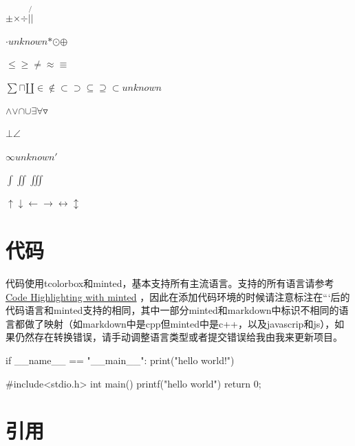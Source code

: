\documentclass{article}%
\begin{document}
%
$\pm{}$$\times{}$$\div{}$$|{}$$\not{|}{}$%

%
$\cdot{}$$unknown$$\ast{}$$\odot{}$$\oplus{}$%

%
$\leq{}$$\geq{}$$\neq{}$$\approx{}$$\equiv{}$%

%
$\sum{}$$\sqcap{}$$\amalg{}$$\in{}$$\notin{}$$\subset{}$$\supset{}$$\subseteq{}$$\supseteq{}$$\subset{}$$unknown$%

%
$\wedge{}$$\vee{}$$\cap{}$$\cup{}$$\exists{}$$\forall{}$$\triangledown{}$%

%
$\bot{}$$\angle{}$%

%
$\infty{}$$unknown$$'{}$%

%
$\int{}$$\iint{}$$\iiint{}$%

%
$\uparrow{}$$\downarrow{}$$\leftarrow{}$$\to{}$$\leftrightarrow{}$$\updownarrow{}$

%

%
%
%

%
\section{代码}%

%
代码使用tcolorbox和minted，基本支持所有主流语言。支持的所有语言请参考 \href{https://www.overleaf.com/learn/latex/Code_Highlighting_with_minted}{Code Highlighting with minted} ，因此在添加代码环境的时候请注意标注在```后的代码语言和minted支持的相同，其中一部分minted和markdown中标识不相同的语言都做了映射（如markdown中是cpp但minted中是c++，以及javascrip和js），如果仍然存在转换错误，请手动调整语言类型或者提交错误给我由我来更新项目。%

%

%
\begin{langbox}[Python]%
if __name__ == "__main__":%
print("hello world!")%
\end{langbox}%

%
%

%

%
\begin{langbox}[C++]%
#include<stdio.h>%
int main(){%
printf("hello world")%
return 0;%
}%
%
\end{langbox}%

%
%
%

%
\section{引用}%

%
\end{document}
